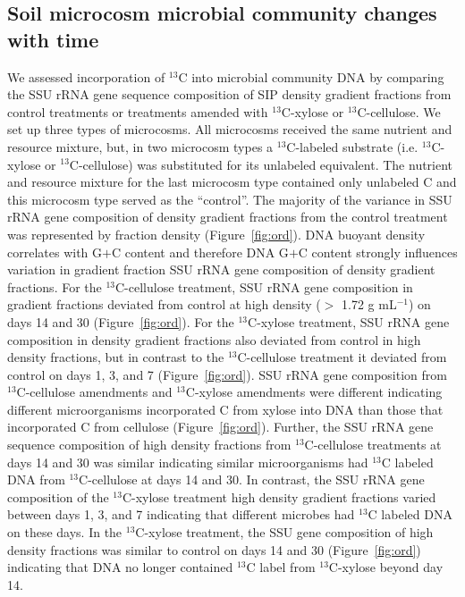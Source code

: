 \subsection{Soil microcosm microbial community changes with time}
We assessed incorporation of $^{13}$C into microbial community DNA by comparing the
SSU rRNA gene sequence composition of SIP density gradient fractions from
control treatments or treatments amended with $^{13}$C-xylose
or $^{13}$C-cellulose. We set up three types of microcosms. All microcosms
received the same nutrient and resource mixture, but, in two microcosm types
a $^{13}$C-labeled substrate (i.e. $^{13}$C-xylose or $^{13}$C-cellulose) was
substituted for its unlabeled equivalent. The nutrient and resource mixture for
the last microcosm type contained only unlabeled C and this microcosm type
served as the ``control''. The majority of the variance in SSU rRNA gene
composition of density gradient fractions from the control treatment was
represented by fraction density (Figure~\ref{fig:ord}). DNA buoyant density
correlates with G$+$C content \citep{Buckley_2007} and therefore DNA G$+$C
content strongly influences variation in gradient fraction SSU rRNA gene
composition of density gradient fractions. For the $^{13}$C-cellulose
treatment, SSU rRNA gene composition in gradient fractions deviated from
control at high density ($>$ 1.72 g mL$^{-1}$) on days 14 and 30
(Figure~\ref{fig:ord}). For the $^{13}$C-xylose treatment, SSU rRNA gene
composition in density gradient fractions also deviated from control in high
density fractions, but in contrast to the $^{13}$C-cellulose treatment it
deviated from control on days 1, 3, and 7 (Figure~\ref{fig:ord}). SSU rRNA gene
composition from $^{13}$C-cellulose amendments and $^{13}$C-xylose amendments
were different indicating different microorganisms incorporated C from xylose
into DNA than those that incorporated C from cellulose (Figure~\ref{fig:ord}).
Further, the SSU rRNA gene sequence composition of high density fractions from
$^{13}$C-cellulose treatments at days 14 and 30 was similar indicating similar
microorganisms had $^{13}$C labeled DNA from $^{13}$C-cellulose at days 14 and
30. In contrast, the SSU rRNA gene composition of the $^{13}$C-xylose treatment
high density gradient fractions varied between days 1, 3, and 7 indicating that
different microbes had $^{13}$C labeled DNA on these days. In the
$^{13}$C-xylose treatment, the SSU gene composition of high density fractions
was similar to control on days 14 and 30 (Figure~\ref{fig:ord}) indicating that
DNA no longer contained $^{13}$C label from $^{13}$C-xylose beyond day 14. 

